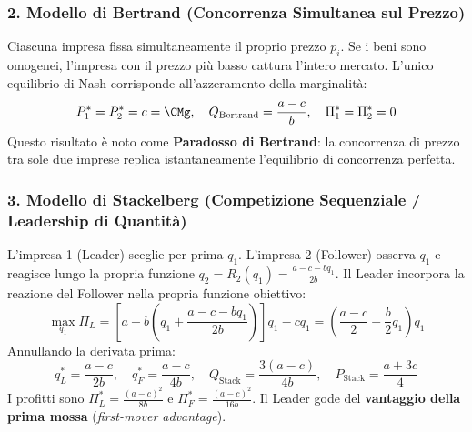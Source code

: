 \subsubsection{2. Modello di Bertrand (Concorrenza Simultanea sul Prezzo)}
Ciascuna impresa fissa simultaneamente il proprio prezzo $p_i$. Se i beni sono omogenei, l'impresa con il prezzo più basso cattura l'intero mercato. L'unico equilibrio di Nash corrisponde all'azzeramento della marginalità:
\begin{equation}
    P_1^* = P_2^* = c = \CMg, \quad Q_{\text{Bertrand}} = \frac{a - c}{b}, \quad \Pi_1^* = \Pi_2^* = 0
\end{equation}
Questo risultato è noto come \textbf{Paradosso di Bertrand}: la concorrenza di prezzo tra sole due imprese replica istantaneamente l'equilibrio di concorrenza perfetta.

\subsubsection{3. Modello di Stackelberg (Competizione Sequenziale / Leadership di Quantità)}
L'impresa 1 (Leader) sceglie per prima $q_1$. L'impresa 2 (Follower) osserva $q_1$ e reagisce lungo la propria funzione $q_2 = R_2(q_1) = \frac{a - c - b q_1}{2b}$. Il Leader incorpora la reazione del Follower nella propria funzione obiettivo:
\begin{equation*}
    \max_{q_1} \Pi_L = \left[ a - b\left(q_1 + \frac{a - c - b q_1}{2b}\right) \right]q_1 - c q_1 = \left( \frac{a - c}{2} - \frac{b}{2} q_1 \right)q_1
\end{equation*}
Annullando la derivata prima:
\begin{equation}
    q_L^* = \frac{a - c}{2b}, \quad q_F^* = \frac{a - c}{4b}, \quad Q_{\text{Stack}} = \frac{3(a - c)}{4b}, \quad P_{\text{Stack}} = \frac{a + 3c}{4}
\end{equation}
I profitti sono $\Pi_L^* = \frac{(a - c)^2}{8b}$ e $\Pi_F^* = \frac{(a - c)^2}{16b}$. Il Leader gode del \textbf{vantaggio della prima mossa} (\textit{first-mover advantage}).

